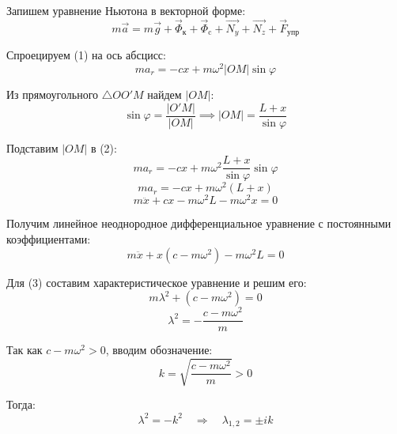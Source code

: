 \documentclass{article}
\begin{document}
\par
Запишем уравнение Ньютона в векторной форме:
\begin{equation}
	m\vec{a} = m\vec{g} + \vec{\Phi}_{\text{к}} + \vec{\Phi}_{\text{c}} + \vec{N_y} + \vec{N_z} + \vec{F}_{\text{упр}}
\end{equation}
\par
Спроецируем (1) на ось абсцисс:
\begin{equation}
	m{a_r} = -cx + m\omega^{2}|OM|\sin\varphi
\end{equation}
\par
Из прямоугольного $\triangle OO'M$ найдем $|OM|$:
\begin{equation*}
	\sin\varphi = \frac{|O'M|}{|OM|} \implies |OM| = \frac{L + x}{\sin\varphi}
\end{equation*}
\par
Подставим $|OM|$ в (2):
\begin{equation*}
	m{a_r} = -cx + m\omega^{2}\frac{L + x}{\sin\varphi}\sin\varphi
\end{equation*}
\begin{equation*}
	m{a_r} = -cx + m\omega^{2}(L + x)
\end{equation*}
\begin{equation*}
		m\ddot{x} + cx - m\omega^{2}L - m\omega^{2} x = 0
\end{equation*}
\par
Получим линейное неоднородное дифференциальное уравнение с постоянными коэффициентами:
\begin{equation}
	m\ddot{x} + x(c - m\omega^{2}) - m\omega^{2}L = 0
\end{equation}
\par
Для (3) составим характеристическое уравнение и решим его:
\begin{equation*}
	m\lambda^{2} + (c - m\omega^{2}) = 0
\end{equation*}
\begin{equation*}
	\lambda^2 = -\frac{c - m\omega^2}{m}
\end{equation*}

Так как \(c - m\omega^2 > 0\), вводим обозначение:
\begin{equation*}
	k = \sqrt{\frac{c - m\omega^2}{m}} > 0
\end{equation*}

Тогда:
\begin{equation*}
	\lambda^2 = -k^2 \quad \Rightarrow \quad \lambda_{1,2} = \pm ik
\end{equation*}
\end{document}
